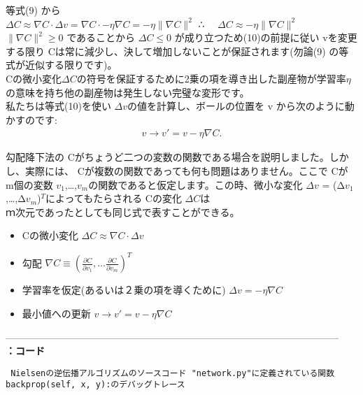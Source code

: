 \documentclass[11pt,a4j,fleqn]{jarticle}
\newcounter{apart}
\begin{document}
等式(9) から\\
\hspace{1.0cm} $ \Delta C \approx \nabla C \cdot \Delta v = \nabla C \cdot -\eta \nabla C =  -\eta \|\nabla C\|^2$
\hspace{1.0cm} ∴　 $\Delta C \approx -\eta \|\nabla C\|^2$ \\
$\|
\nabla C \|^2 \geq 0$ であることから $\Delta C \leq 0$ が成り立つため(10)の前提に従い vを変更する限り Cは常に減少し、決して増加しないことが保証されます(勿論(9) の等式が近似する限りです)。\\
  Cの微小変化$\Delta C$の符号を保証するために2乗の項を導き出した副産物が学習率$\eta$の意味を持ち他の副産物は発生しない完璧な変形です。\\
私たちは等式(10)を使い $\Delta v$の値を計算し、ボールの位置を v から次のように動かすのです:\\
\begin{eqnarray}
  v \rightarrow v' = v -\eta \nabla C.
\end{eqnarray}


勾配降下法の Cがちょうど二つの変数の関数である場合を説明しました。しかし、実際には、 Cが複数の関数であっても何も問題はありません。ここで Cが m個の変数 $v_1$,…,$v_m$の関数であると仮定します。この時、微小な変化 $\Delta v$ = (Δ$v_1$,…,Δ$v_m$)$^T$によってもたらされる Cの変化 $\Delta C$は\\
ｍ次元であったとしても同じ式で表すことができる。\\
\begin{itemize}
 \item  Cの微小変化\hspace{0.5cm} $ \Delta C \approx \nabla C \cdot \Delta v$
 \item  勾配 \hspace{0.5cm}  $\nabla C \equiv \left(\frac{\partial C}{\partial v_1}, \ldots \frac{\partial C}{\partial v_m}\right)^T$
 \item  学習率を仮定(あるいは２乗の項を導くために) \hspace{0.5cm} $\Delta v = -\eta \nabla C$
 \item  最小値への更新\hspace{0.5cm} $v \rightarrow v' = v-\eta \nabla C$
\end{itemize}
------------------------------------------------------------------------------------------------------\\
\newpage
\textbf{\Large \theapart ：コード}
\begin{verbatim}
 Nielsenの逆伝播アルゴリズムのソースコード "network.py"に定義されている関数backprop(self, x, y):のデバッグトレース
\end{verbatim}
\end{document}
